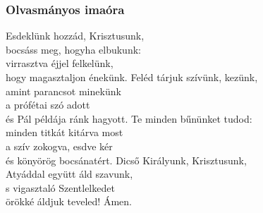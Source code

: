 \documentclass[twoside]{article}
\begin{document}

\subsubsection*{Olvasmányos imaóra}



\begin{hymnstanzas}
    Esdeklünk hozzád, Krisztusunk,\\
    bocsáss meg, hogyha elbukunk:\\
    virrasztva éjjel felkelünk,\\
    hogy magasztaljon énekünk.
\stanzabreak
    Feléd tárjuk szívünk, kezünk,\\
    amint parancsot minekünk\\
    a prófétai szó adott\\
    és Pál példája ránk hagyott.
\stanzabreak
    Te minden bűnünket tudod:\\
    minden titkát kitárva most\\
    a szív zokogva, esdve kér\\
    és könyörög bocsánatért.
\stanzabreak
    Dicső Királyunk, Krisztusunk,\\
    Atyáddal együtt áld szavunk,\\
    s vigasztaló Szentlelkedet\\
    örökké áldjuk teveled! Ámen.
\end{hymnstanzas}



\end{document}
